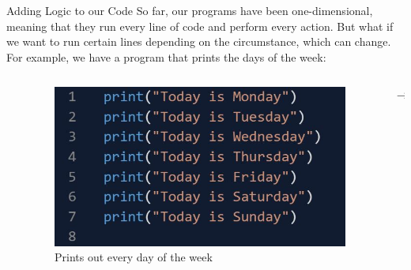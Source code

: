 \documentclass[hyperref={pdfpagemode=FullScreen},aspectratio=169]{beamer}
\begin{document}
  \begin{frame}{Adding Logic to our Code}
    So far, our programs have been one-dimensional, meaning that they run every line of code and perform every action. But what if we want to run certain lines depending on the circumstance, which can change. For example, we have a program that prints the days of the week: 

    \bigskip

    \begin{columns}[c]
      \begin{column}{0.03\textwidth}
      \end{column}
      \begin{column}{0.45\textwidth}
        \begin{figure}
          \includegraphics[scale=0.45]{./imgs/logicProgramCode.jpg}
          \caption*{Prints out every day of the week}
        \end{figure}
      \end{column}
  
      \hfill
  
      \begin{column}{0.05\textwidth}
        {\huge $\rightarrow$}
      \end{column}
  
      \hfill
  

\end{columns}
\end{frame}
\end{document}
